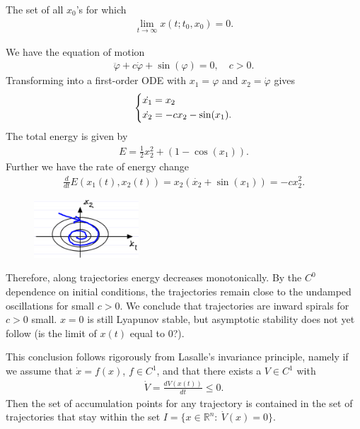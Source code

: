 \begin{definition}
	The set of all $x_0$'s for which
	\begin{align}
		\boxed{\lim_{t\to \infty }x(t;t_0, x_0)=0. }	
	\end{align}
	
\end{definition}

\begin{ex}
	We have the equation of motion
	\begin{align}
		\ddot{\varphi} + c \dot{\varphi} + \sin(\varphi) = 0,\quad c>0.
	\end{align}
	Transforming into a first-order ODE with $x_1 = \varphi$ and $x_2 = \dot{\varphi}$ gives
	 \begin{align}
		\begin{dcases}
			\dot{x_1} = x_2\\ \dot{x_2} = -cx_2 - \sin(x_1).
		\end{dcases}
	\end{align}
The total energy is given by
\begin{align}
	E = \frac{1}{2}x_2^2 + \left( 1 - \cos(x_1) \right). 
\end{align}
Further we have the rate of energy change
\begin{align}
	\frac{d}{dt} E(x_1(t), x_2(t)) = x_2 \left(\dot{x_2} + \sin(x_1) \right) = -c x_2^{2}.
\end{align}
\begin{figure}[h]
	\centering
	\includegraphics[width=0.35\textwidth]{figures/ch2/4damped_pendulum.png}
\end{figure}

Therefore, along trajectories energy decreases monotonically. By the $C^0$ dependence on initial conditions, the trajectories remain close to the undamped oscillations for small $c>0$. We conclude that trajectories are inward spirals for $c>0$ small. $x=0$ is still Lyapunov stable, but asymptotic stability does not yet follow (is the limit of $x(t)$ equal to 0?).
\begin{remark}
	This conclusion follows rigorously from Lasalle's invariance principle, namely if we assume that $\dot{x}=f(x)$, $f \in C^1$, and that there exists a $V\in C^1$ with 
	\begin{align}
		\dot{V} = \frac{dV(x(t))}{dt} \leq 0.	
	\end{align}
	Then the set of accumulation points for any trajectory is contained in the set of trajectories that stay within the set $I=\{x \in \mathbb{R}^{n}:\ \dot{V}(x) = 0\}$.
\end{remark}
\end{ex}

